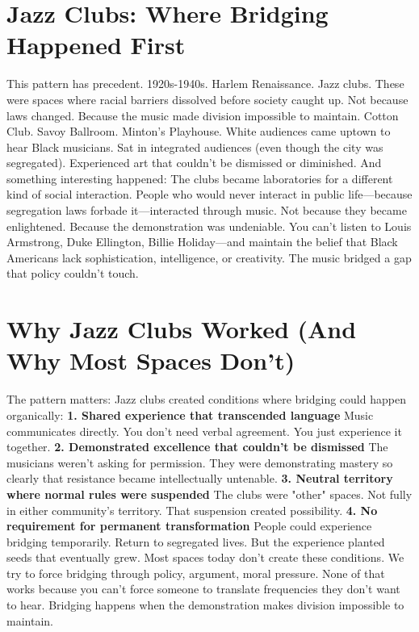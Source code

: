 \documentclass[12pt,openany]{book}
\begin{document}
\section{Jazz Clubs: Where Bridging Happened First}

This pattern has precedent.
1920s-1940s. Harlem Renaissance. Jazz clubs.
These were spaces where racial barriers dissolved before society caught up. Not because laws changed. Because the music made division impossible to maintain.
Cotton Club. Savoy Ballroom. Minton's Playhouse.
White audiences came uptown to hear Black musicians. Sat in integrated audiences (even though the city was segregated). Experienced art that couldn't be dismissed or diminished.
And something interesting happened:
The clubs became laboratories for a different kind of social interaction. People who would never interact in public life—because segregation laws forbade it—interacted through music.
Not because they became enlightened. Because the demonstration was undeniable.
You can't listen to Louis Armstrong, Duke Ellington, Billie Holiday—and maintain the belief that Black Americans lack sophistication, intelligence, or creativity.
The music bridged a gap that policy couldn't touch.

\section{Why Jazz Clubs Worked (And Why Most Spaces Don't)}

The pattern matters:
Jazz clubs created conditions where bridging could happen organically:
\textbf{1. Shared experience that transcended language}
Music communicates directly. You don't need verbal agreement. You just experience it together.
\textbf{2. Demonstrated excellence that couldn't be dismissed}
The musicians weren't asking for permission. They were demonstrating mastery so clearly that resistance became intellectually untenable.
\textbf{3. Neutral territory where normal rules were suspended}
The clubs were "other" spaces. Not fully in either community's territory. That suspension created possibility.
\textbf{4. No requirement for permanent transformation}
People could experience bridging temporarily. Return to segregated lives. But the experience planted seeds that eventually grew.
Most spaces today don't create these conditions.
We try to force bridging through policy, argument, moral pressure. None of that works because you can't force someone to translate frequencies they don't want to hear.
Bridging happens when the demonstration makes division impossible to maintain.
\end{document}
